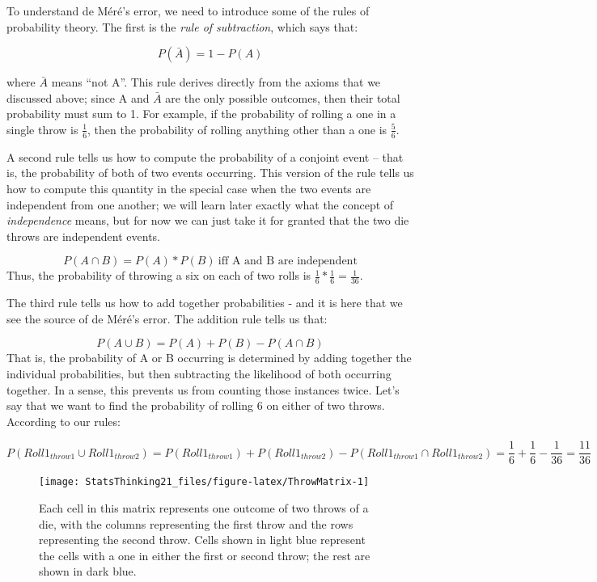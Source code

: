 \documentclass[]{book}
\theoremstyle{definition}
\theoremstyle{definition}
\theoremstyle{definition}
\theoremstyle{remark}
\begin{document}
To understand de Méré's error, we need to introduce some of the rules of
probability theory. The first is the \emph{rule of subtraction}, which
says that:

\[
P(\bar{A}) = 1 - P(A)
\]

where \(\bar{A}\) means ``not A''. This rule derives directly from the
axioms that we discussed above; since A and \(\bar{A}\) are the only
possible outcomes, then their total probability must sum to 1. For
example, if the probability of rolling a one in a single throw is
\(\frac{1}{6}\), then the probability of rolling anything other than a
one is \(\frac{5}{6}\).

A second rule tells us how to compute the probability of a conjoint
event -- that is, the probability of both of two events occurring. This
version of the rule tells us how to compute this quantity in the special
case when the two events are independent from one another; we will learn
later exactly what the concept of \emph{independence} means, but for now
we can just take it for granted that the two die throws are independent
events.

\[
P(A \cap B) = P(A) * P(B)\ \text{iff A and B are independent}
\] Thus, the probability of throwing a six on each of two rolls is
\(\frac{1}{6}*\frac{1}{6}=\frac{1}{36}\).

The third rule tells us how to add together probabilities - and it is
here that we see the source of de Méré's error. The addition rule tells
us that:

\[
P(A \cup B) = P(A) + P(B) - P(A \cap B)
\] That is, the probability of A or B occurring is determined by adding
together the individual probabilities, but then subtracting the
likelihood of both occurring together. In a sense, this prevents us from
counting those instances twice. Let's say that we want to find the
probability of rolling 6 on either of two throws. According to our
rules:

\[
P(Roll1_{throw1} \cup Roll1_{throw2}) = P(Roll1_{throw1}) + P(Roll1_{throw2}) - P(Roll1_{throw1} \cap Roll1_{throw2}) = \frac{1}{6} + \frac{1}{6} - \frac{1}{36} = \frac{11}{36}
\]

\begin{figure}
\texttt{[image: StatsThinking21\_files/figure-latex/ThrowMatrix-1]} \caption{Each cell in this matrix represents one outcome of two throws of a die, with the columns representing the first throw and the rows representing the second throw. Cells shown in light blue represent the cells with a one in either the first or second throw; the rest are shown in dark blue.}\label{fig:ThrowMatrix}
\end{figure}
\end{document}
